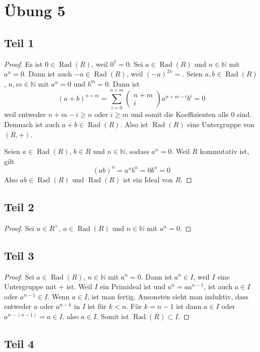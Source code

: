 \documentclass[10pt,a4paper]{article}
\DeclareMathOperator{\rad}{Rad}
\begin{document}
\section{Übung 5}

\subsection{Teil 1}

\begin{proof}
  Es ist $0 \in \rad(R)$, weil $0^{1} = 0$.
  Sei $a \in \rad(R)$ und $n \in \mathbb{N}$ mit $a^{n} = 0$.
  Dann ist auch $-a \in \rad(R)$, weil $(-a)^{2n} = $.
  Seien $a, b \in \rad(R)$, $n, m \in \mathbb{N}$ mit $a^{n} = 0$ und $b^{m} = 0$.
  Dann ist
  \begin{equation}
    (a + b)^{n + m} = \sum_{i = 0}^{n + m} \begin{pmatrix}n + m\\i\end{pmatrix} a^{n + m - i}b^{i} = 0
  \end{equation}
  weil entweder $n + m - i \ge n$ oder $i \ge m$ und somit die Koeffizienten alle $0$ sind.
  Demnach ist auch $a + b \in \rad(R)$.
  Also ist $\rad(R)$ eine Untergruppe von $(R, +)$.

  Seien $a \in \rad(R)$, $b \in R$ und $n \in \mathbb{N}$, sodass $a^{n} = 0$.
  Weil $R$ kommutativ ist, gilt
  \begin{equation}
    (ab)^{n} = a^{n}b^{n} = 0b^{n} = 0
  \end{equation}
  Also $ab \in \rad(R)$ und $\rad(R)$ ist ein Ideal von $R$.
\end{proof}

\subsection{Teil 2}

\begin{proof}
  Sei $u \in R^{\times}$, $a \in \rad(R)$ und $n \in \mathbb{N}$ mit $a^{n} = 0$.
\end{proof}

\subsection{Teil 3}

\begin{proof}
  Sei $a \in \rad(R)$, $n \in \mathbb{N}$ mit $a^{n} = 0$.
  Dann ist $a^{n} \in I$, weil $I$ eine Untergruppe mit $+$ ist.
  Weil $I$ ein Primideal ist und $a^{n} = aa^{n - 1}$, ist auch $a \in I$ oder $a^{n - 1} \in I$.
  Wenn $a \in I$, ist man fertig.
  Ansonsten sieht man induktiv, dass entweder $a$ oder $a^{n - k}$ in $I$ ist für $k < n$.
  Für $k = n - 1$ ist dann $a \in I$ oder $a^{n - (n - 1)} = a \in I$, also $a \in I$.
  Somit ist $\rad(R) \subset I$.
\end{proof}

\subsection{Teil 4}
\end{document}
